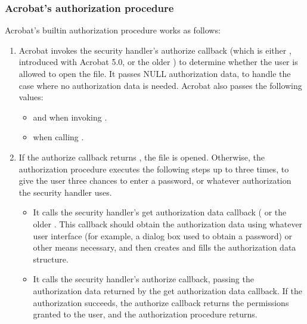 \documentclass[letterpaper,12pt,english,openany,oneside]{sphinxmanual}
\begin{document}
\subsubsection{Acrobat’s authorization procedure}
\label{\detokenize{Plugins_Security:acrobat-s-authorization-procedure}}
Acrobat’s built\sphinxhyphen{}in authorization procedure works as follows:
\begin{enumerate}
%
\item {} 
Acrobat invokes the security handler’s authorize callback (which is either , introduced with Acrobat 5.0, or the older  ) to determine whether the user is allowed to open the file. It passes NULL authorization data, to handle the case where no authorization data is needed. Acrobat also passes the following values:
\begin{itemize}
\item {} 
 and  when invoking .

\item {} 
 when calling .

\end{itemize}

\item {} 
If the authorize callback returns , the file is opened. Otherwise, the authorization procedure executes the following steps up to three times, to give the user three chances to enter a password, or whatever authorization the security handler uses.
\begin{itemize}
\item {} 
It calls the security handler’s get authorization data callback ( or the older . This callback should obtain the authorization data using whatever user interface (for example, a dialog box used to obtain a password) or other means necessary, and then creates and fills the authorization data structure.

\item {} 
It calls the security handler’s authorize callback, passing the authorization data returned by the get authorization data callback. If the authorization succeeds, the authorize callback returns the permissions granted to the user, and the authorization procedure returns.

\end{itemize}

\end{enumerate}
\end{document}
